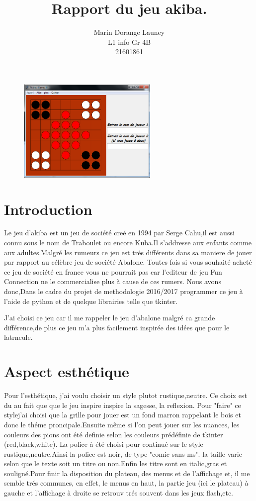 \documentclass{article}
\title{Rapport du jeu akiba.}
\author{Marin Dorange Launey\\
		L1 info Gr 4B\\
        21601861}
\begin{document}
\maketitle

\begin{figure}[!h]
\centerline{\includegraphics[width=0.6\textwidth]{images/Akiba.png}}
\vspace{1cm}
\caption{}
\end{figure}


\newpage{}
\tableofcontents{}

\newpage{}

\section{Introduction}

Le jeu d'akiba est un jeu de société creé en 1994 par Serge Cahu,il est aussi connu sous le nom de Traboulet ou encore Kuba.Il s'addresse aux enfants comme aux adultes.Malgré les rumeurs ce jeu est trés différents dans sa maniere de jouer par rapport au célèbre jeu de société Abalone. Toutes fois si vous souhaité acheté ce jeu de société en france vous ne pourrait pas car l'editeur de jeu Fun Connection ne le commercialise plus à cause de ces rumers. Nous avons donc,Dans le cadre du projet de methodologie 2016/2017 programmer ce jeu à l'aide de python et de quelque librairies telle que tkinter.

J'ai choisi ce jeu car il me rappeler le jeu d'abalone malgré ca grande différence,de plus ce jeu m'a plus facilement inspirée des idées que pour le latrncule.

\section{Aspect esthétique}
Pour l'esthétique, j'ai voulu choisir un style plutot rustique,neutre. Ce choix est du au fait que que le jeu inspire inspire la sagesse, la reflexion. Pour "faire" ce stylej'ai choisi que la grille pour jouer est un fond marron rappelant le bois et donc le théme proncipale.Ensuite même si l'on peut jouer sur les nuances, les couleurs des pions ont été definie selon les couleurs prédéfinie de tkinter (red,black,white). La police à été choisi pour continué sur le style rustique,neutre.Ainsi la police est noir, de type "comic sans ms". la taille varie selon que le texte soit un titre ou non.Enfin les titre sont en italic,gras et souligné.Pour finir la disposition du plateau, des menus et de l'affichage et, il me semble trés communes, en effet, le menus en haut, la partie jeu (ici le plateau) à gauche et l'affichage à droite se retrouv trés souvent dans les jeux flash,etc.
\end{document}
